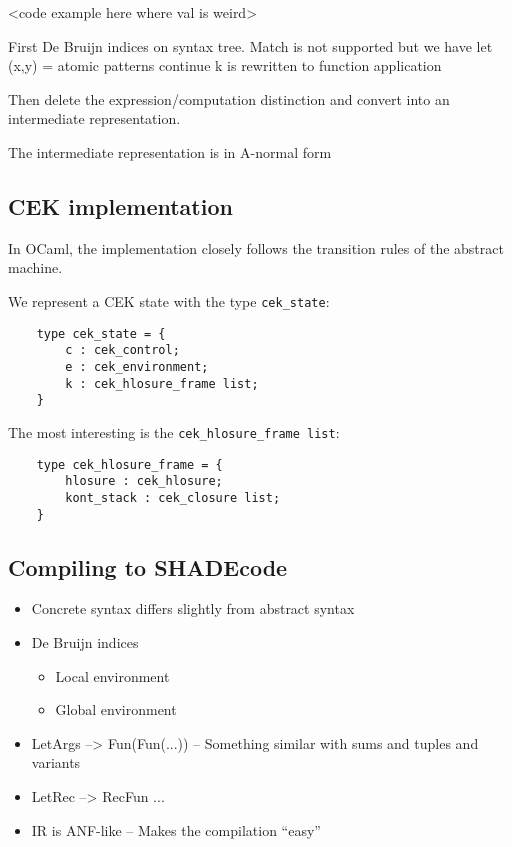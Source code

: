 \documentclass[class=article, crop=false]{standalone}
\begin{document}
<code example here where val is weird>

First De Bruijn indices on syntax tree.
Match is not supported but we have let (x,y) =
atomic patterns
continue k is rewritten to function application

Then delete the expression/computation distinction and convert into
an intermediate representation.

The intermediate representation is in A-normal form 

\subsection{CEK implementation}

In OCaml, the implementation closely follows the transition rules of the abstract machine.

We represent a CEK state with the type \verb|cek_state|:
\begin{verbatim}
    type cek_state = {
        c : cek_control;
        e : cek_environment;
        k : cek_hlosure_frame list;
    }
\end{verbatim}

The most interesting is the \verb|cek_hlosure_frame list|:
\begin{verbatim}
    type cek_hlosure_frame = {
        hlosure : cek_hlosure;
        kont_stack : cek_closure list;
    }
\end{verbatim}

\subsection{Compiling to SHADEcode}


\begin{itemize}
\item Concrete syntax differs slightly from abstract syntax
\item De Bruijn indices
\begin{itemize}
    \item Local environment
    \item Global environment
\end{itemize}
\item LetArgs --> Fun(Fun(...)) -- Something similar with sums and tuples and variants
\item LetRec --> RecFun ...
\item IR is ANF-like -- Makes the compilation ``easy''
\end{itemize}
\end{document}
